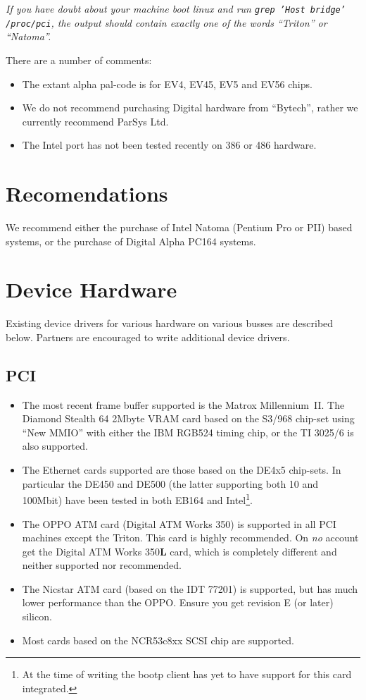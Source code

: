 \emph{If you have doubt about your machine boot linux and run
  \texttt{grep 'Host bridge' /proc/pci}, the output should contain
  exactly one of the words ``Triton'' or ``Natoma''.}

There are a number of comments:
\begin{itemize}
\item The extant alpha pal-code is for EV4, EV45, EV5 and EV56 chips.
\item We do not recommend purchasing Digital hardware from
  ``Bytech'', rather we currently recommend ParSys Ltd.
\item The Intel port has not been tested recently on 386 or 486 hardware.
\end{itemize}

\section{Recomendations}

We recommend either the purchase of Intel Natoma (Pentium Pro or
P{\small II}) based
systems,  or the purchase of Digital Alpha PC164 systems.

\section{Device Hardware}

Existing device drivers for various hardware on various busses are
described below.  Partners are encouraged to write additional device
drivers.

\subsection{PCI}
\begin{itemize}
\item The most recent frame buffer supported is the Matrox
  Millennium~II.  The Diamond Stealth 64 2Mbyte VRAM card based on the
  S3/968 chip-set using ``New MMIO'' with either the IBM RGB524 timing
  chip, or the TI 3025/6 is also supported.
\item The Ethernet cards supported are those based on the DE4x5
  chip-sets.  In particular the DE450 and DE500 (the latter supporting
  both 10 and 100Mbit) have been tested in both EB164 and
  Intel\footnote{At the time of writing the bootp client has yet to
    have support for this card integrated.}.
\item The OPPO ATM card (Digital ATM Works 350) is supported in all
  PCI machines except the Triton.  This card is highly recommended.
  On \emph{no} account get the Digital ATM Works 350{\bf L} card, which is
  completely different and neither supported nor recommended.
\item The Nicstar ATM card (based on the IDT 77201) is supported, but
  has much lower performance than the OPPO.  Ensure you get revision E
  (or later) silicon.
\item Most cards based on the NCR53c8xx SCSI chip are supported.
\end{itemize}

